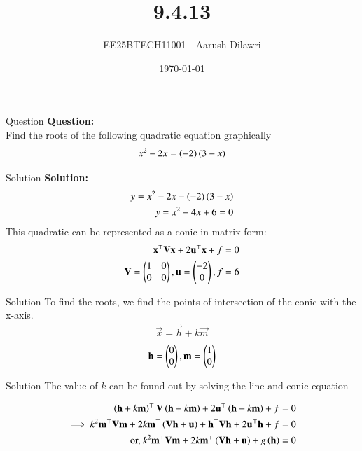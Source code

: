 \documentclass{beamer}
\title{9.4.13}
\date{\today}
\author{EE25BTECH11001 - Aarush Dilawri}
\begin{document}
\frame{\titlepage}
\begin{frame}{Question}
\textbf{Question:}\\
Find the roots of the following quadratic equation graphically
\begin{align}
    x^2 -2x = \left(-2\right)\left(3-x\right)
\end{align}
\end{frame}

\begin{frame}{Solution}
\textbf{Solution:}\\
\begin{align}
    y = x^2 -2x - \left(-2\right)\left(3-x\right)\\
    y = x^2 - 4x + 6 =0
\end{align}
This quadratic can be represented as a conic in matrix form:
\begin{align}
   \mathbf{x}^{\top}\mathbf{V}\mathbf{x} + 2\mathbf{u}^{\top}\mathbf{x} + f = 0\\ 
   \mathbf{V} = \begin{pmatrix}1 & 0 \\ 0 & 0\end{pmatrix} , \mathbf{u} = \begin{pmatrix}-2 \\0\end{pmatrix} ,
   f = 6
\end{align}
\end{frame}

\begin{frame}{Solution}
To find the roots, we find the points of intersection of the conic with the x-axis.
\begin{align}
\vec{x} = \vec{h} + k\vec{m}    
\end{align}
\begin{align}
\mathbf{h}=\begin{pmatrix}0 \\ 0\end{pmatrix}, \mathbf{m} = \begin{pmatrix}1 \\ 0\end{pmatrix}
\end{align}
\end{frame}

\begin{frame}{Solution}
The value of $k$ can be found out by solving the line and conic equation

\begin{align}
\left(\mathbf{h} + k \mathbf{m}\right)^{\top} \mathbf{V} \left(\mathbf{h} + k \mathbf{m}\right) + 2\mathbf{u}^{\top} \left(\mathbf{h} + k \mathbf{m}\right) + f &= 0 \\
\implies k^{2} \mathbf{m}^{\top}\mathbf{V}\mathbf{m} + 2k \mathbf{m}^{\top} \left(\mathbf{V}\mathbf{h} + \mathbf{u}\right) + \mathbf{h}^{\top}\mathbf{V}\mathbf{h} + 2\mathbf{u}^{\top}\mathbf{h} + f &= 0 \\
\text{or, } k^{2} \mathbf{m}^{\top}\mathbf{V}\mathbf{m} + 2k \mathbf{m}^{\top} \left(\mathbf{V}\mathbf{h} + \mathbf{u}\right) + g\left(\mathbf{h}\right) &= 0
\end{align}
\end{frame}
\end{document}
